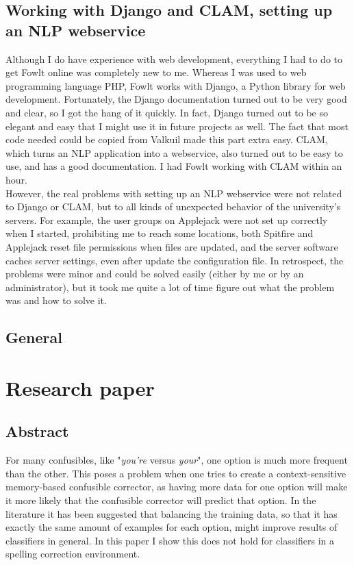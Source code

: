 \documentclass[12pt]{article}
\let\stdsection\section
\renewcommand\section{\newpage\stdsection}
\begin{document}
\subsection{Working with Django and CLAM, setting up an NLP webservice}
Although I do have experience with web development, everything I had to do to get Fowlt online was completely new to me. Whereas I was used to web programming language PHP, Fowlt works with Django, a Python library for web development. Fortunately, the Django documentation turned out to be very good and clear, so I got the hang of it quickly. In fact, Django turned out to be so elegant and easy that I might use it in future projects as well. The fact that most code needed could be copied from Valkuil made this part extra easy. CLAM, which turns an NLP application into a webservice, also turned out to be easy to use, and has a good documentation. I had Fowlt working with CLAM within an hour.
\\\indent
However, the real problems with setting up an NLP webservice were not related to Django or CLAM, but to all kinds of unexpected behavior of the university's servers. For example, the user groups on Applejack were not set up correctly when I started, prohibiting me to reach some locations, both Spitfire and Applejack reset file permissions when files are updated, and the server software caches server settings, even after update the configuration file. In retrospect, the problems were minor and could be solved easily (either by me or by an administrator), but it took me quite a lot of time figure out what the problem was and how to solve it.

\subsection{General}


\section{Research paper}

\subsection*{Abstract}

For many confusibles, like "\emph{you're} versus \emph{your}", one option is much more frequent than the other. This poses a problem when one tries to create a context-sensitive memory-based confusible corrector, as having more data for one option will make it more likely that the confusible corrector will predict that option. In the literature it has been suggested that balancing the training data, so that it has exactly the same amount of examples for each option, might improve results of classifiers in general. In this paper I show this does not hold for classifiers in a spelling correction environment.
\end{document}
